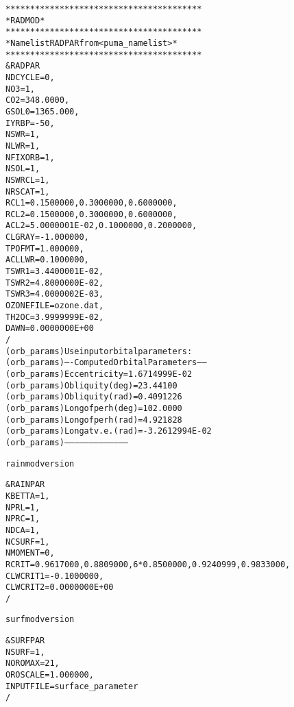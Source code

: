 \begin{alltt}
 ****************************************
 * RADMOD                               *
 ****************************************
 * Namelist RADPAR from <puma_namelist> *
 ****************************************
 &RADPAR
 NDCYCLE =           0,
 NO3     =           1,
 CO2     =   348.0000    ,
 GSOL0   =   1365.000    ,
 IYRBP   =         -50,
 NSWR    =           1,
 NLWR    =           1,
 NFIXORB =           1,
 NSOL    =           1,
 NSWRCL  =           1,
 NRSCAT  =           1,
 RCL1    =  0.1500000,0.3000000, 0.6000000  ,
 RCL2    =  0.1500000,0.3000000,  0.6000000  ,
 ACL2    =  5.0000001E-02,0.1000000,  0.2000000 ,
 CLGRAY  =  -1.000000    ,
 TPOFMT  =   1.000000    ,
 ACLLWR  =  0.1000000    ,
 TSWR1   =  3.4400001E-02,
 TSWR2   =  4.8000000E-02,
 TSWR3   =  4.0000002E-03,
 OZONEFILE       = ozone.dat                                                                       ,
 TH2OC   =  3.9999999E-02,
 DAWN    =  0.0000000E+00
 /
 (orb_params) Use input orbital parameters: 
 (orb_params) ---- Computed Orbital Parameters -----
 (orb_params) Eccentricity      =   1.6714999E-02
 (orb_params) Obliquity (deg)   =  23.44100    
 (orb_params) Obliquity (rad)   =   0.4091226    
 (orb_params) Long of perh(deg) = 102.0000    
 (orb_params) Long of perh(rad) =   4.921828    
 (orb_params) Long at v.e.(rad) =  -3.2612994E-02
 (orb_params) ---------------------------------------

rainmod version

 &RAINPAR
 KBETTA  =           1,
 NPRL    =           1,
 NPRC    =           1,
 NDCA    =           1,
 NCSURF  =           1,
 NMOMENT =           0,
 RCRIT   =  0.9617000,0.8809000,6*0.8500000,0.9240999,0.9833000,
 CLWCRIT1        = -0.1000000    ,
 CLWCRIT2        =  0.0000000E+00
 /

surfmod version

 &SURFPAR
 NSURF   =           1,
 NOROMAX =          21,
 OROSCALE        =   1.000000    ,
 INPUTFILE       = surface_parameter                                                               
 /


\end{alltt}
